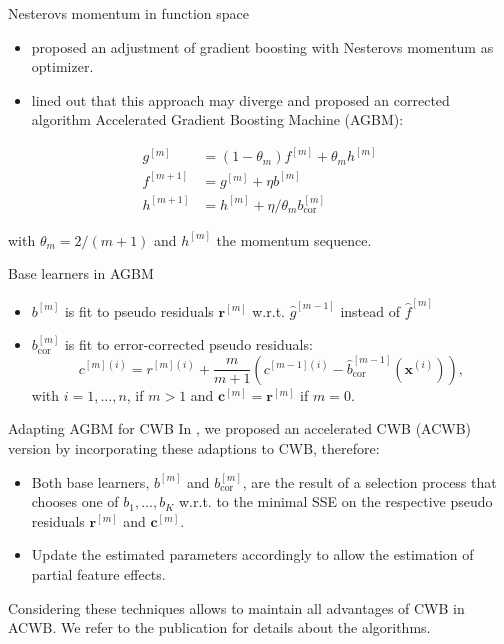 \documentclass[ignorenonframetext,]{beamer}
\providecommand{\tightlist}{%
  \setlength{\itemsep}{0pt}\setlength{\parskip}{0pt}}
\newcommand{\fh}{\hat{f}}
\newcommand{\fmh}{\fh^{[m]}}
\newcommand{\xv}{\bm{x}}
\newcommand{\pr}{r}
\newcommand{\prv}{\bm{r}}
\newcommand{\rmi}{\pr^{[m](i)}}
\renewcommand{\xi}[1][i]{\xv^{(#1)}}
\newcommand{\rmm}{\prv^{[m]}}
\begin{document}
\begin{frame}{Nesterovs momentum in function space}
\protect\hypertarget{nesterovs-momentum-in-function-space}{}
\begin{itemize}
\tightlist
\item
  \citet{biau2019accelerated} proposed an adjustment of gradient
  boosting with Nesterovs momentum as optimizer.
\item
  \citet{lu2020accelerating} lined out that this approach may diverge
  and proposed an corrected algorithm Accelerated Gradient Boosting
  Machine (AGBM):
\end{itemize}

\vspace{-0.9cm}
\begin{align*}
g^{[m]} &= (1 - \theta_m) f^{[m]} + \theta_m h^{[m]}\\
f^{[m+1]} &= g^{[m]} + \eta b^{[m]} \\
h^{[m+1]} &= h^{[m]} + \eta / \theta_m b^{[m]}_{\text{cor}}
\end{align*}

with \(\theta_m = 2 / (m + 1)\) and \(h^{[m]}\) the momentum sequence.
\end{frame}

\begin{frame}{Base learners in AGBM}
\protect\hypertarget{base-learners-in-agbm}{}
\begin{itemize}
\tightlist
\item
  \(b^{[m]}\) is fit to pseudo residuals \(\rmm\) w.r.t.
  \(\hat{g}^{[m-1]}\) instead of \(\fmh\)
\item
  \(b^{[m]}_{\text{cor}}\) is fit to error-corrected pseudo residuals:
  \[c^{[m](i)} = \rmi + \frac{m}{m+1}(c^{[m-1](i)} - \hat{b}_{\text{cor}}^{[m-1]}(\xi)),\]
  with \(i = 1, \dots, n\), if \(m > 1\) and \(\bm{c}^{[m]} = \rmm\) if
  \(m = 0\).
\end{itemize}
\end{frame}

\begin{frame}{Adapting AGBM for CWB}
\protect\hypertarget{adapting-agbm-for-cwb}{}
In \citet{schalk2022accelerated}, we proposed an accelerated CWB (ACWB)
version by incorporating these adaptions to CWB, therefore:

\begin{itemize}
\tightlist
\item
  Both base learners, \(b^{[m]}\) and \(b^{[m]}_{\text{cor}}\), are the
  result of a selection process that chooses one of \(b_1, \dots, b_K\)
  w.r.t. to the minimal SSE on the respective pseudo residuals \(\rmm\)
  and \(\bm{c}^{[m]}\).
\item
  Update the estimated parameters accordingly to allow the estimation of
  partial feature effects.
\end{itemize}

Considering these techniques allows to maintain all advantages of CWB in
ACWB. We refer to the publication for details about the algorithms.
\end{frame}
\end{document}
